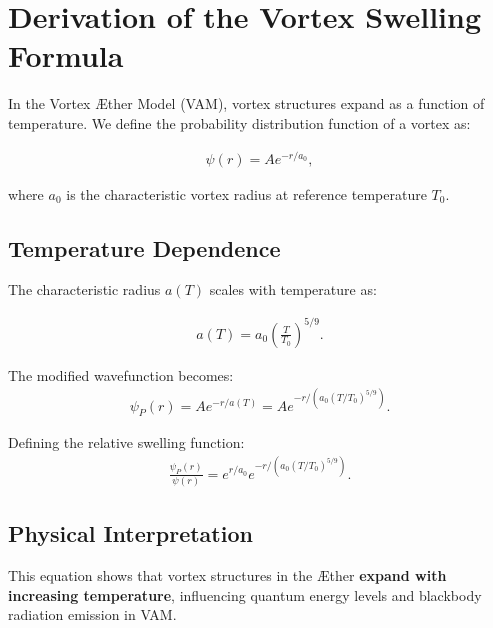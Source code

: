 

\section{Derivation of the Vortex Swelling Formula}

In the Vortex Æther Model (VAM), vortex structures expand as a function of temperature. We define the probability distribution function of a vortex as:

\begin{align}
    \psi(r) = A e^{-r/a_0},
\end{align}

where \( a_0 \) is the characteristic vortex radius at reference temperature \( T_0 \).

\subsection{Temperature Dependence}
The characteristic radius \( a(T) \) scales with temperature as:

\begin{align}
    a(T) = a_0 \left(\frac{T}{T_0}\right)^{5/9}.
\end{align}

The modified wavefunction becomes:
\begin{align}
    \psi_P(r) = A e^{-r/a(T)} = A e^{-r/(a_0 (T/T_0)^{5/9})}.
\end{align}

Defining the relative swelling function:
\begin{align}
    \frac{\psi_P(r)}{\psi(r)} = e^{r/a_0} e^{-r/(a_0 (T/T_0)^{5/9})}.
\end{align}

\subsection{Physical Interpretation}
This equation shows that vortex structures in the Æther \textbf{expand with increasing temperature}, influencing quantum energy levels and blackbody radiation emission in VAM.
